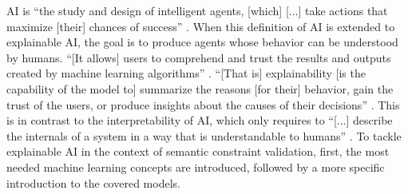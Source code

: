 \documentclass[../../../thesis]{subfiles}
\begin{document}
    AI is ``the study and design of intelligent agents, [which] [...] take actions that maximize [their] chances of success'' \cite{russell2002artificial}. When this definition of AI is extended to explainable AI, the goal is to produce agents whose behavior can be understood by humans. ``[It allows] users to comprehend and trust the results and outputs created by machine learning algorithms'' \cite{ibmExplainableAI}. ``[That is] explainability [is the capability of the model to] summarize the reasons [for their] behavior, gain the trust of the users, or produce insights about the causes of their decisions'' \cite{gilpin2018explaining}. This is in contrast to the interpretability of AI, which only requires to ``[...] describe the internals of a
    system in a way that is understandable to humans'' \cite{gilpin2018explaining}. To tackle explainable AI in the context of semantic constraint validation, first, the most needed machine learning concepts are introduced, followed by a more specific introduction to the covered models.
\end{document}
